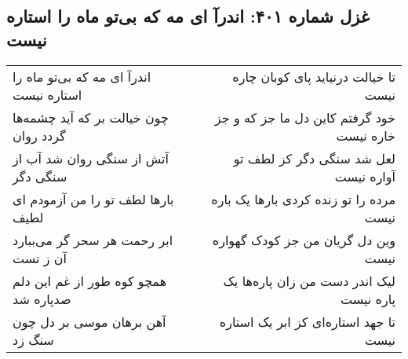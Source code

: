 \begin{center}
\section*{غزل شماره ۴۰۱: اندرآ ای مه که بی‌تو ماه را استاره نیست}
\label{sec:0401}
\begin{longtable}{l p{0.5cm} r}
اندرآ ای مه که بی‌تو ماه را استاره نیست
&&
تا خیالت درنیاید پای کوبان چاره نیست
\\
چون خیالت بر که آید چشمه‌ها گردد روان
&&
خود گرفتم کاین دل ما جز که و جز خاره نیست
\\
آتش از سنگی روان شد آب از سنگی دگر
&&
لعل شد سنگی دگر کز لطف تو آواره نیست
\\
بارها لطف تو را من آزمودم ای لطیف
&&
مرده را تو زنده کردی بارها یک باره نیست
\\
ابر رحمت هر سحر گر می‌ببارد آن ز تست
&&
وین دل گریان من جز کودک گهواره نیست
\\
همچو کوه طور از غم این دلم صدپاره شد
&&
لیک اندر دست من زان پاره‌ها یک پاره نیست
\\
آهن برهان موسی بر دل چون سنگ زد
&&
تا جهد استاره‌ای کز ابر یک استاره نیست
\\
\end{longtable}
\end{center}
